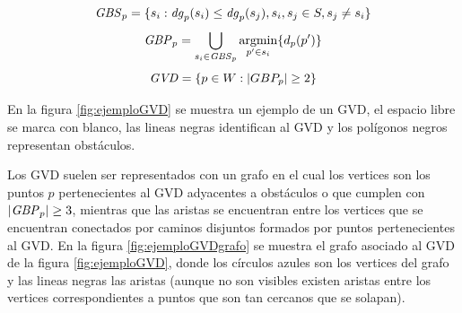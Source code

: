

\begin{equation}
  \mathit{GBS}_p = \{s_i : \mathit{dg}_p(s_i) \leq \mathit{dg}_p(s_j), s_i,s_j\in S,s_j \neq s_i\}\label{eq:GBS}
\end{equation}
\begin{equation}
  \mathit{GBP}_p =\bigcup_{s_i \in \mathit{GBS}_p} \operatorname*{argmin}_{p'\in s_i}\{d_p(p')\}\label{eq:GBP}
\end{equation}
\begin{equation}
  \mathit{GVD}  = \{p \in W : |GBP_p| \geq 2\}\label{eq:GVD}
\end{equation}

En la figura \ref{fig:ejemploGVD} se muestra un ejemplo de un GVD, el espacio libre se marca con blanco, las lineas negras identifican al GVD y los polígonos negros representan obstáculos. 

Los GVD suelen ser representados con un grafo en el cual los vertices son los puntos $p$ pertenecientes al GVD adyacentes a obstáculos o que cumplen con $|\mathit{GBP}_p|\geq 3$, mientras que las aristas se encuentran entre los vertices que se encuentran conectados por caminos disjuntos formados por puntos pertenecientes al GVD. En la figura \ref{fig:ejemploGVDgrafo} se muestra el grafo asociado al GVD de la figura \ref{fig:ejemploGVD}, donde los círculos azules son los vertices del grafo y las lineas negras las aristas (aunque no son visibles existen aristas entre los vertices correspondientes a puntos que son tan cercanos que se solapan).

